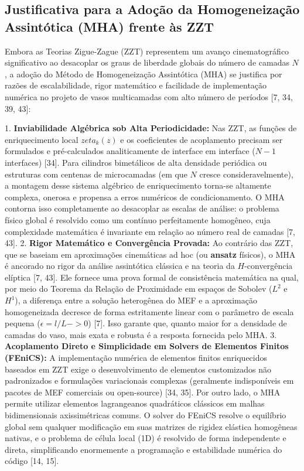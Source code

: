 \subsection{Justificativa para a Adoção da Homogeneização Assintótica (MHA) frente às ZZT}

Embora as Teorias Zigue-Zague (ZZT) representem um avanço cinematográfico significativo ao desacoplar os graus de liberdade globais do número de camadas $N$, a adoção do Método de Homogeneização Assintótica (MHA) se justifica por razões de escalabilidade, rigor matemático e facilidade de implementação numérica no projeto de vasos multicamadas com alto número de períodos [7, 34, 39, 43]:

1. \textbf{Inviabilidade Algébrica sob Alta Periodicidade:} Nas ZZT, as funções de enriquecimento local $zeta_k (z)$ e os coeficientes de acoplamento precisam ser formulados e pré-calculados analiticamente de interface em interface ($N-1$ interfaces) [34]. Para cilindros bimetálicos de alta densidade periódica ou estruturas com centenas de microcamadas (em que $N$ cresce consideravelmente), a montagem desse sistema algébrico de enriquecimento torna-se altamente complexa, onerosa e propensa a erros numéricos de condicionamento. O MHA contorna isso completamente ao desacoplar as escalas de análise: o problema físico global é resolvido como um contínuo perfeitamente homogêneo, cuja complexidade matemática é invariante em relação ao número real de camadas [7, 43].
2. \textbf{Rigor Matemático e Convergência Provada:} Ao contrário das ZZT, que se baseiam em aproximações cinemáticas ad hoc (ou \textbf{ansatz} físicos), o MHA é ancorado no rigor da análise assintótica clássica e na teoria da $H$-convergência elíptica [7, 43]. Ele fornece uma prova formal de consistência matemática na qual, por meio do Teorema da Relação de Proximidade em espaços de Sobolev ($L^2$ e $H^1$), a diferença entre a solução heterogênea do MEF e a aproximação homogeneizada decresce de forma estritamente linear com o parâmetro de escala pequena ($\epsilon = l/L -> 0$) [7]. Isso garante que, quanto maior for a densidade de camadas do vaso, mais exata e robusta é a resposta fornecida pelo MHA.
3. \textbf{Acoplamento Direto e Simplicidade em Solvers de Elementos Finitos (FEniCS):} A implementação numérica de elementos finitos enriquecidos baseados em ZZT exige o desenvolvimento de elementos customizados não padronizados e formulações variacionais complexas (geralmente indisponíveis em pacotes de MEF comerciais ou open-source) [34, 35]. Por outro lado, o MHA permite utilizar elementos lagrangeanos quadráticos clássicos em malhas bidimensionais axissimétricas comuns. O solver do FEniCS resolve o equilíbrio global sem qualquer modificação em suas matrizes de rigidez elástica homogêneas nativas, e o problema de célula local (1D) é resolvido de forma independente e direta, simplificando enormemente a programação e estabilidade numérica do código [14, 15].
